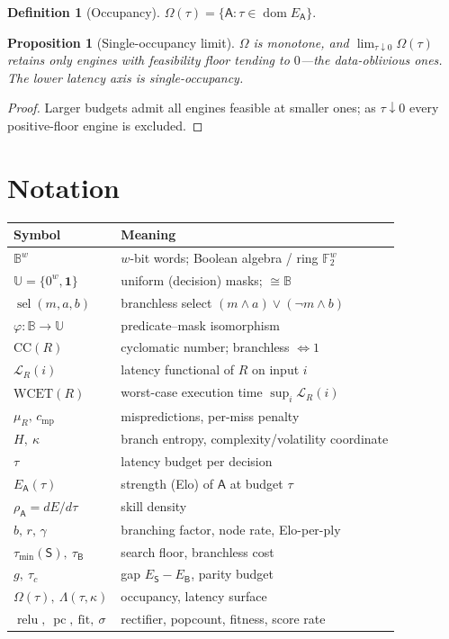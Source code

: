\documentclass[11pt,oneside]{book}
\theoremstyle{definition}
\newtheorem{definition}{Definition}[chapter]
\theoremstyle{plain}
\newtheorem{proposition}{Proposition}[chapter]
\theoremstyle{remark}
\newcommand{\Bits}{\mathbb{B}}
\newcommand{\Word}[1]{\Bits^{#1}}
\newcommand{\Unif}{\mathbb{U}}
\newcommand{\sel}{\operatorname{sel}}
\newcommand{\phimap}{\varphi}
\newcommand{\Lat}{\mathcal{L}}
\newcommand{\WCET}{\mathrm{WCET}}
\newcommand{\Elo}{E}
\newcommand{\Engine}{\mathsf{A}}
\newcommand{\Search}{\mathsf{S}}
\newcommand{\Branchless}{\mathsf{B}}
\newcommand{\budget}{\tau}
\newcommand{\kvol}{\kappa}
\newcommand{\skill}{\rho}
\newcommand{\score}{\sigma}
\newcommand{\Ent}{H}
\newcommand{\relu}{\operatorname{relu}}
\newcommand{\popc}{\operatorname{pc}}
\newcommand{\occ}{\Omega}
\newcommand{\fit}{\mathrm{fit}}
\DeclareMathOperator{\dom}{dom}
\begin{document}
\begin{definition}[Occupancy]
$\occ(\budget)=\{\Engine:\budget\in\dom\Elo_\Engine\}$.
\end{definition}

\begin{proposition}[Single-occupancy limit]\label{prop:occ}
$\occ$ is monotone, and $\lim_{\budget\downarrow0}\occ(\budget)$ retains only engines with
feasibility floor tending to $0$---the data-oblivious ones. The lower latency axis is
single-occupancy.
\end{proposition}
\begin{proof}
Larger budgets admit all engines feasible at smaller ones; as $\budget\downarrow0$ every
positive-floor engine is excluded.
\end{proof}

\appendix
\chapter{Notation}\label{app:notation}
\begin{center}
\begin{tabular}{ll}
\toprule
Symbol & Meaning\\
\midrule
$\Word{w}$ & $w$-bit words; Boolean algebra / ring $\mathbb{F}_2^w$\\
$\Unif=\{0^w,\mathbf{1}\}$ & uniform (decision) masks; $\cong\Bits$\\
$\sel(m,a,b)$ & branchless select $(m\wedge a)\vee(\neg m\wedge b)$\\
$\phimap:\Bits\to\Unif$ & predicate--mask isomorphism\\
$\mathrm{CC}(R)$ & cyclomatic number; branchless $\Leftrightarrow1$\\
$\Lat_R(i)$ & latency functional of $R$ on input $i$\\
$\WCET(R)$ & worst-case execution time $\sup_i\Lat_R(i)$\\
$\mu_R,\,c_{\mathrm{mp}}$ & mispredictions, per-miss penalty\\
$\Ent,\ \kvol$ & branch entropy, complexity/volatility coordinate\\
$\budget$ & latency budget per decision\\
$\Elo_\Engine(\budget)$ & strength (Elo) of $\Engine$ at budget $\budget$\\
$\skill_\Engine=d\Elo/d\budget$ & skill density\\
$b,\,r,\,\gamma$ & branching factor, node rate, Elo-per-ply\\
$\budget_{\min}(\Search),\ \budget_\Branchless$ & search floor, branchless cost\\
$g,\ \budget_c$ & gap $\Elo_\Search-\Elo_\Branchless$, parity budget\\
$\occ(\budget),\ \Lambda(\budget,\kvol)$ & occupancy, latency surface\\
$\relu,\ \popc,\ \fit,\ \score$ & rectifier, popcount, fitness, score rate\\
\bottomrule
\end{tabular}
\end{center}
\end{document}
